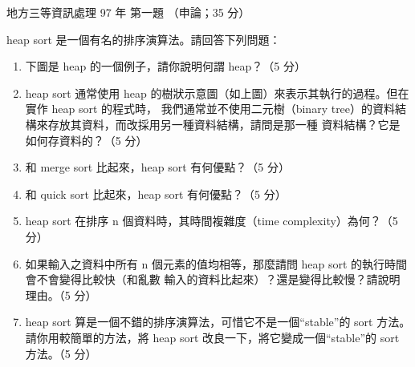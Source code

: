 \begin{pastexam}[label={px:df3-097-ds-01}]{地方三等資訊處理 97 年 第一題}
（申論；35 分）

heap sort 是一個有名的排序演算法。請回答下列問題：
\begin{enumerate}[leftmargin=2.6em, labelsep=0.4em]
\item[㈠] 下圖是 heap 的一個例子，請你說明何謂 heap？（5 分）
\begin{center}
\end{center}
\item[㈡] heap sort 通常使用 heap 的樹狀示意圖（如上圖）來表示其執行的過程。但在實作 heap sort 的程式時，
我們通常並不使用二元樹（binary tree）的資料結構來存放其資料，而改採用另一種資料結構，請問是那一種
資料結構？它是如何存資料的？（5 分）
\item[㈢] 和 merge sort 比起來，heap sort 有何優點？（5 分）
\item[㈣] 和 quick sort 比起來，heap sort 有何優點？（5 分）
\item[㈤] heap sort 在排序 n 個資料時，其時間複雜度（time complexity）為何？（5 分）
\item[㈥] 如果輸入之資料中所有 n 個元素的值均相等，那麼請問 heap sort 的執行時間會不會變得比較快（和亂數
輸入的資料比起來）？還是變得比較慢？請說明理由。（5 分）
\item[㈦] heap sort 算是一個不錯的排序演算法，可惜它不是一個“stable”的 sort 方法。請你用較簡單的方法，將
heap sort 改良一下，將它變成一個“stable”的 sort 方法。（5 分）
\end{enumerate}
\end{pastexam}

